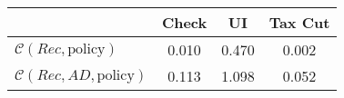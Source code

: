 \begin{tabular}{@{}lccc@{}} 
\toprule 
                          & Check      & UI    & Tax Cut    \\  \midrule 
$\mathcal{C}(Rec,\text{policy})$ & 0.010  & 0.470  & 0.002     \\ 
$\mathcal{C}(Rec, AD,\text{policy})$ & 0.113  & 1.098  & 0.052     \\ 
\end{tabular}  
